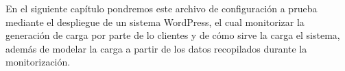 En el siguiente capítulo pondremos este archivo de configuración a prueba mediante el despliegue de un sistema WordPress, el cual monitorizar la generación de carga por parte de lo clientes y de cómo sirve la carga el sistema, además de modelar la carga a partir de los datos recopilados durante la monitorización.
\newpage